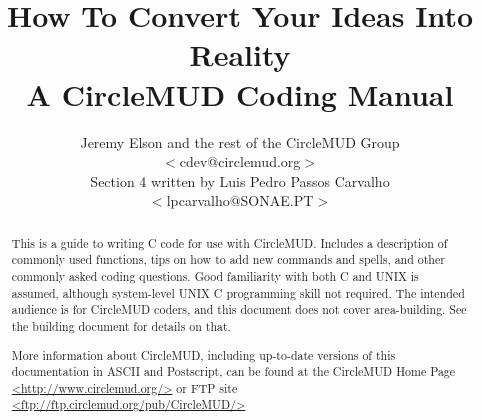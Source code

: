 \documentclass[11pt]{article}
\title{How To Convert Your Ideas Into Reality\\
A CircleMUD Coding Manual}
\author{Jeremy Elson and the rest of the CircleMUD Group\\
$<$cdev@circlemud.org$>$\\
Section 4 written by Luis Pedro Passos Carvalho\\
$<$lpcarvalho@SONAE.PT$>$}
\begin{document}
\maketitle

\begin{abstract}
This is a guide to writing C code for use with CircleMUD.  Includes a description of commonly used functions, tips on how to add new commands and spells, and other commonly asked coding questions.  Good familiarity with both C and UNIX is assumed, although  system-level UNIX C programming skill not required.  The intended audience is for CircleMUD coders, and this document does not cover area-building.  See the building document for details on that.
\par
More information about CircleMUD, including up-to-date versions of this documentation in ASCII and Postscript, can be found at the CircleMUD Home Page \url{<http://www.circlemud.org/>} or 
FTP site \url{<ftp://ftp.circlemud.org/pub/CircleMUD/>}
\end{abstract}

\tableofcontents
\end{document}
